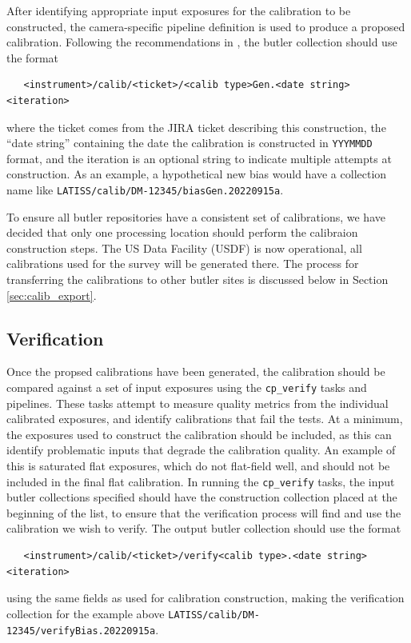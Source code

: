 \documentclass[DM,authoryear,toc]{lsstdoc}
\begin{document}
After identifying appropriate input exposures for the calibration to be constructed, the camera-specific pipeline definition is used to produce a proposed calibration.  Following the recommendations in , the butler collection should use the format
\begin{verbatim}
   <instrument>/calib/<ticket>/<calib type>Gen.<date string><iteration>
\end{verbatim}
\noindent where the ticket comes from the JIRA ticket describing this construction, the ``date string'' containing the date the calibration is constructed in \verb|YYYMMDD| format, and the iteration is an optional string to indicate multiple attempts at construction.  As an example, a hypothetical new bias would have a collection name like \verb|LATISS/calib/DM-12345/biasGen.20220915a|.

To ensure all butler repositories have a consistent set of calibrations, we have decided that only one processing location should perform the calibraion construction steps.  The US Data Facility (USDF) is now operational, all calibrations used for the survey will be generated there.  The process for transferring the calibrations to other butler sites is discussed below in Section \ref{sec:calib_export}.

\subsection{Verification}

Once the propsed calibrations have been generated, the calibration should be compared against a set of input exposures using the \verb|cp_verify| tasks and pipelines.  These tasks attempt to measure quality metrics from the individual calibrated exposures, and identify calibrations that fail the tests.  At a minimum, the exposures used to construct the calibration should be included, as this can identify problematic inputs that degrade the calibration quality.  An example of this is saturated flat exposures, which do not flat-field well, and should not be included in the final flat calibration.  In running the \verb|cp_verify| tasks, the input butler collections specified should have the construction collection placed at the beginning of the list, to ensure that the verification process will find and use the calibration we wish to verify.  The output butler collection should use the format
\begin{verbatim}
   <instrument>/calib/<ticket>/verify<calib type>.<date string><iteration>
\end{verbatim}
\noindent using the same fields as used for calibration construction, making the verification collection for the example above \verb|LATISS/calib/DM-12345/verifyBias.20220915a|.
\end{document}
